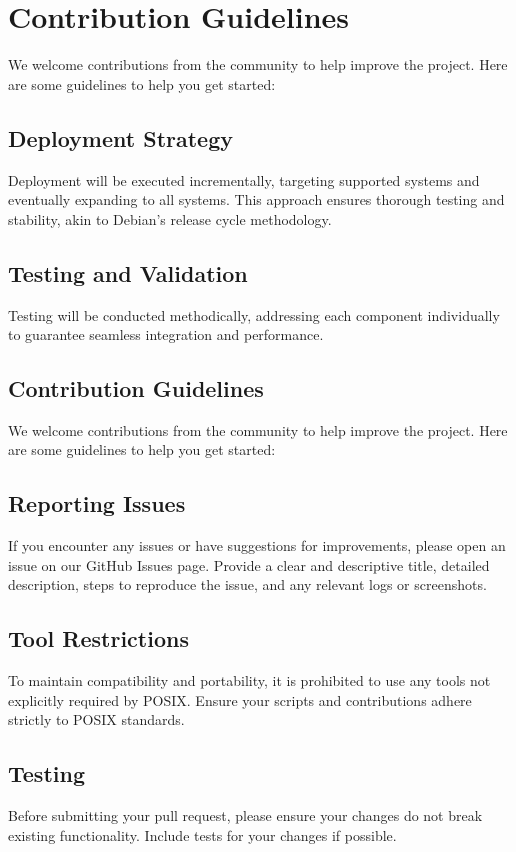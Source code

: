 \section{Contribution Guidelines}
We welcome contributions from the community to help improve the project. Here are some guidelines to help you get started:

\subsection{Deployment Strategy}

Deployment will be executed incrementally, targeting supported systems and eventually expanding to all systems. This approach ensures thorough testing and stability, akin to Debian's release cycle methodology.

\subsection{Testing and Validation}

Testing will be conducted methodically, addressing each component individually to guarantee seamless integration and performance.

\subsection{Contribution Guidelines}

We welcome contributions from the community to help improve the project. Here are some guidelines to help you get started:

\subsection{Reporting Issues}
If you encounter any issues or have suggestions for improvements, please open an issue on our GitHub Issues page. Provide a clear and descriptive title, detailed description, steps to reproduce the issue, and any relevant logs or screenshots.

\subsection{Tool Restrictions}
To maintain compatibility and portability, it is prohibited to use any tools not explicitly required by POSIX. Ensure your scripts and contributions adhere strictly to POSIX standards.

\subsection{Testing}
Before submitting your pull request, please ensure your changes do not break existing functionality. Include tests for your changes if possible.


